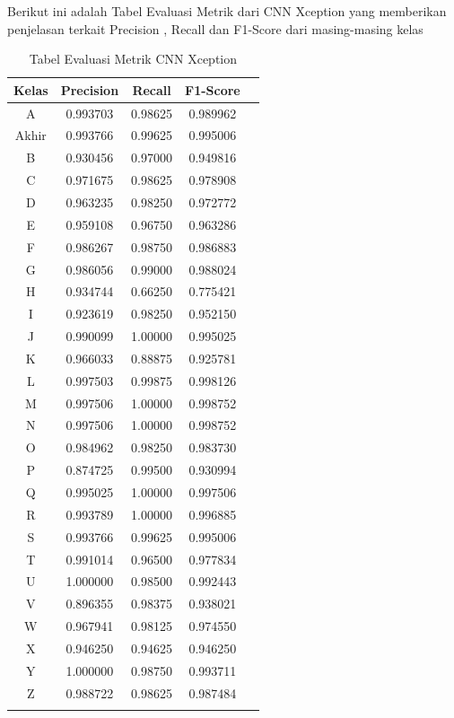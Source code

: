 Berikut ini adalah Tabel Evaluasi Metrik dari CNN Xception yang memberikan penjelasan terkait Precision , Recall dan F1-Score dari masing-masing kelas 

\begin{table}[h]
\centering
\caption{Tabel Evaluasi Metrik CNN Xception}
\begin{tabular}{|c|c|c|c|c|}
\hline
Kelas & Precision & Recall & F1-Score \\
\hline
A & 0.993703 & 0.98625 & 0.989962 \\
Akhir & 0.993766 & 0.99625 & 0.995006 \\
B & 0.930456 & 0.97000 & 0.949816 \\
C & 0.971675 & 0.98625 & 0.978908 \\
D & 0.963235 & 0.98250 & 0.972772 \\
E & 0.959108 & 0.96750 & 0.963286 \\
F & 0.986267 & 0.98750 & 0.986883 \\
G & 0.986056 & 0.99000 & 0.988024 \\
H & 0.934744 & 0.66250 & 0.775421 \\
I & 0.923619 & 0.98250 & 0.952150 \\
J & 0.990099 & 1.00000 & 0.995025 \\
K & 0.966033 & 0.88875 & 0.925781 \\
L & 0.997503 & 0.99875 & 0.998126 \\
M & 0.997506 & 1.00000 & 0.998752 \\
N & 0.997506 & 1.00000 & 0.998752 \\
O & 0.984962 & 0.98250 & 0.983730 \\
P & 0.874725 & 0.99500 & 0.930994 \\
Q & 0.995025 & 1.00000 & 0.997506 \\
R & 0.993789 & 1.00000 & 0.996885 \\
S & 0.993766 & 0.99625 & 0.995006 \\
T & 0.991014 & 0.96500 & 0.977834 \\
U & 1.000000 & 0.98500 & 0.992443 \\
V & 0.896355 & 0.98375 & 0.938021 \\
W & 0.967941 & 0.98125 & 0.974550 \\
X & 0.946250 & 0.94625 & 0.946250 \\
Y & 1.000000 & 0.98750 & 0.993711 \\
Z & 0.988722 & 0.98625 & 0.987484 \\
\hline
\label{tab:tabelevaluasicnnxception}
\end{tabular}
\end{table}

